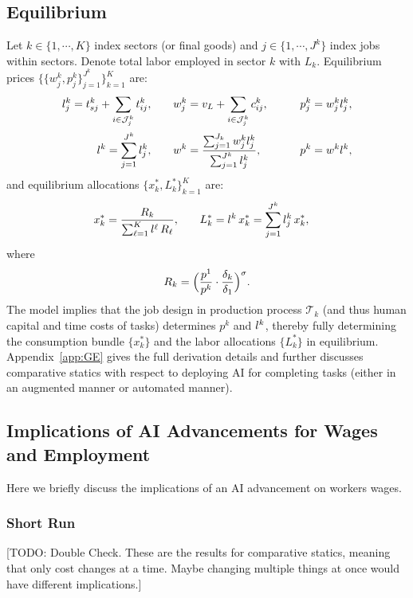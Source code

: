 \documentclass{article}
\theoremstyle{plain}
\theoremstyle{plain}
\begin{document}
\subsection{Equilibrium}
\label{sec:eq_GE}
Let $k \in \{1, \cdots, K\}$ index sectors (or final goods) and $j \in \{1,\cdots, J^k \}$ index jobs within sectors.
Denote total labor employed in sector $k$ with $L_k$.
Equilibrium prices $\big\{ \big\{ w_j^k, p_j^k \big\}_{j=1}^{J^k} \big\}_{k=1}^K$ are: 
\begin{align*}
l_{j}^k =  t_{sj}^k + \sum_{i \in \mathcal{J}_j^k} t_{ij}^{k},
& \qquad
w_j^k =  v_L + \sum_{i \in \mathcal{J}_j^k} c_{ij}^{k}, 
& \qquad
p_j^k = w_j^k l_{j}^k, \\
l_{}^k = \sum_{j=1}^{J^k} l_{j}^k,
& \qquad
w^k = \frac{\sum_{j=1}^{J_k} w_j^k l_{j}^k}{\sum_{j=1}^{J^k} l_{j}^k},
& \qquad
p^k = w^k l_{}^k,
\end{align*}
and equilibrium allocations $\big\{ x_k^*, L_k^* \big\}_{k=1}^K$ are:
\begin{align*}
x_k^* = \frac{R_k}{\sum_{\ell=1}^K l_{}^\ell\,R_\ell},
& \qquad
L_k^* = l_{}^k\,x_k^* = \sum_{j=1}^{J^k} l_{j}^k\,x_k^*,
\end{align*}
where
\[
R_k = \Bigl(\frac{p^1}{p^k} \cdot \frac{\delta_k}{\delta_1}\Bigr)^{\sigma}.
\]
The model implies that the job design in production process $\mathcal{T}_k$ (and thus human capital and time costs of tasks) determines $p^k$ and $l_{}^k$, thereby fully determining the consumption bundle $\{x_k^*\}$ and the labor allocations $\{L_k^*\}$ in equilibrium.
Appendix~\ref{app:GE} gives the full derivation details and further discusses comparative statics with respect to deploying AI for completing tasks (either in an augmented manner or automated manner).



\subsection{Implications of AI Advancements for Wages and Employment}

Here we briefly discuss the implications of an AI advancement on workers wages.

\subsubsection{Short Run}
[TODO: Double Check. These are the results for comparative statics, meaning that only cost changes at a time. Maybe changing multiple things at once would have different implications.]
\end{document}
